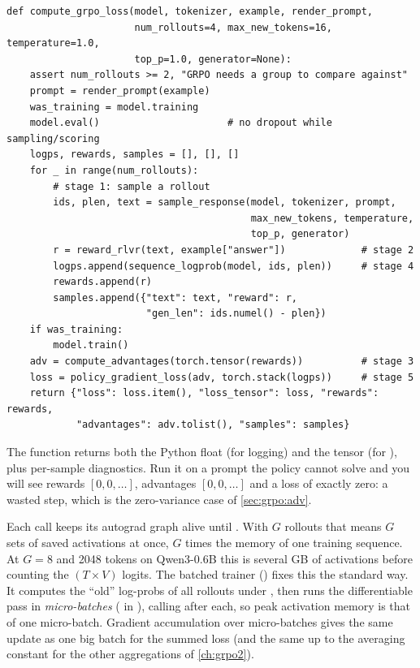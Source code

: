 \begin{lstlisting}[caption={\texttt{compute\_grpo\_loss}: stages 1--5 for one training example.},label={lst:grpo:compute}]
def compute_grpo_loss(model, tokenizer, example, render_prompt,
                      num_rollouts=4, max_new_tokens=16, temperature=1.0,
                      top_p=1.0, generator=None):
    assert num_rollouts >= 2, "GRPO needs a group to compare against"
    prompt = render_prompt(example)
    was_training = model.training
    model.eval()                      # no dropout while sampling/scoring
    logps, rewards, samples = [], [], []
    for _ in range(num_rollouts):
        # stage 1: sample a rollout
        ids, plen, text = sample_response(model, tokenizer, prompt,
                                          max_new_tokens, temperature,
                                          top_p, generator)
        r = reward_rlvr(text, example["answer"])             # stage 2
        logps.append(sequence_logprob(model, ids, plen))     # stage 4
        rewards.append(r)
        samples.append({"text": text, "reward": r,
                        "gen_len": ids.numel() - plen})
    if was_training:
        model.train()
    adv = compute_advantages(torch.tensor(rewards))          # stage 3
    loss = policy_gradient_loss(adv, torch.stack(logps))     # stage 5
    return {"loss": loss.item(), "loss_tensor": loss, "rewards": rewards,
            "advantages": adv.tolist(), "samples": samples}
\end{lstlisting}

The function returns both the Python float (for logging) and the tensor (for
), plus per-sample diagnostics. Run it on a prompt the policy cannot solve
and you will see rewards $[0,0,\dots]$, advantages $[0,0,\dots]$ and a loss of exactly zero:
a wasted step, which is the zero-variance case of \cref{sec:grpo:adv}.

\begin{systemslens}
Each  call keeps its autograd graph alive until .
With $G$ rollouts that means $G$ sets of saved activations at once, $G$ times the memory
of one training sequence. At $G=8$ and 2048 tokens on Qwen3-0.6B this is several GB of
activations before counting the $(T\times V)$ logits. The batched trainer
() fixes this the standard way. It computes the ``old'' log-probs of all
rollouts under , then runs the differentiable pass in \emph{micro-batches}
( in ), calling  after each, so peak
activation memory is that of one micro-batch. Gradient accumulation over micro-batches gives
the same update as one big batch for the summed loss (and the same up to the averaging
constant for the other aggregations of \cref{ch:grpo2}).
\end{systemslens}

